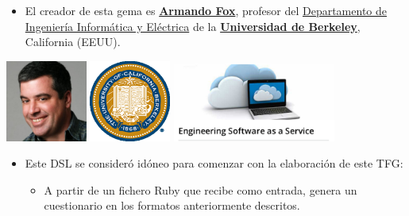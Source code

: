 \documentclass{beamer}
\begin{document}
\begin{frame}[allowframebreaks]
  \begin{itemize}
    \item El creador de esta gema es \href{http://www.armandofox.com/geek}{{\bfseries Armando Fox}}, profesor del 
    \href{http://www.cs.berkeley.edu/}{Departamento de Ingeniería Informática y Eléctrica} de la 
    \href{http://www.berkeley.edu/}{{\bfseries Universidad de Berkeley}}, California (EEUU).
  \end{itemize}
  \begin{center}
    \includegraphics[width=0.2\textwidth]{img/armando.eps}
    \hspace*{0.8cm}
    \includegraphics[width=0.2\textwidth]{img/Berkeley.eps}
    \hspace*{0.5cm}
    \includegraphics[width=0.4\textwidth]{img/sassmoc.eps}
  \end{center}
  \framebreak
  
  \begin{itemize}
    \item Este DSL se consideró idóneo para comenzar con la elaboración de este TFG:
    \begin{itemize}
      \item A partir de un fichero Ruby que recibe como entrada, genera un cuestionario en los formatos anteriormente descritos.
    \end{itemize}
    
    \begin{center}
    \end{center}
    

\end{itemize}
\end{frame}
\end{document}
